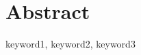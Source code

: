 \chapter*{Abstract}



{\centering
\parbox{0.85\textwidth}{

        \begin{keywords}
            {keyword1, keyword2, keyword3}
        \end{keywords}

        \vspace{5mm}

	\lipsum[1-1]

        }\par}

\vfill\vfill
\normalsize
\clearpage

\newpage
